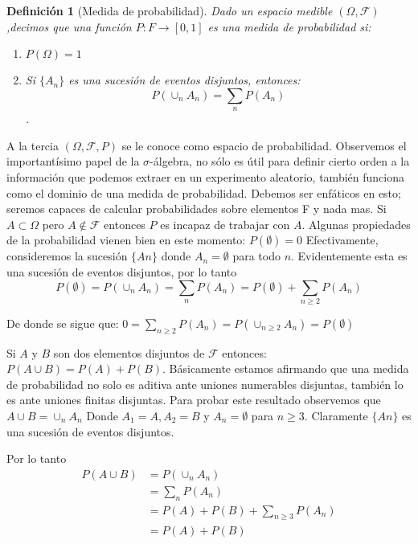 \documentclass[14pt]{extreport}
\newtheorem{definition}{Definición}[chapter]
\begin{document}
\begin{definition}[Medida de probabilidad]
Dado un espacio medible $(\Omega, \mathcal{F})$,decimos que una función $P : F \rightarrow [0,1]$ es una medida de probabilidad si:

\begin{enumerate}
    \item $P(\Omega) = 1$
    \item Si $\{A_n \}$ es una sucesión de eventos disjuntos, entonces:
    $$P\left(\cup_n A_n \right) = \sum_n P(A_n)$$.
\end{enumerate}
\end{definition}

A la tercia $(\Omega, \mathcal{F}, P)$ se le conoce como espacio de probabilidad. Observemos el importantísimo papel de la $\sigma$-álgebra, no sólo es útil para definir cierto orden a la información que podemos extraer en un experimento aleatorio, también funciona como el dominio de una medida de probabilidad. Debemos ser enfáticos en esto; seremos capaces de calcular probabilidades sobre elementos F y nada mas. Si $A \subset \Omega$ pero $A \notin \mathcal{F}$ entonces $P$ es incapaz de trabajar con $A$. Algunas propiedades de la probabilidad vienen bien en este momento: $P(\emptyset) = 0$ Efectivamente, consideremos la sucesión $\{An \}$ donde $A_n = \emptyset$ para todo $n$. Evidentemente esta es una sucesión de eventos disjuntos, por lo tanto 
$$
P(\emptyset) = P\left(\cup_n A_n\right) = \sum_n P(A_n ) = P(\emptyset) + \sum_{n\geq2} P(A_n )
$$

De donde se sigue que: $0 = \sum_{n\geq 2} P(A_n) = P\left(\cup_{n\geq 2} A_n\right) = P(\emptyset)$

Si $A$ y $B$ son dos elementos disjuntos de $\mathcal{F}$ entonces: $P\left(A \cup B\right) = P(A) + P(B)$. Básicamente estamos afirmando que una medida de probabilidad no solo es aditiva ante uniones numerables disjuntas, también lo es ante uniones finitas disjuntas. Para probar este resultado observemos que $A \cup B = \cup_n A_n$ Donde $A_1 = A, A_2 = B$ y $A_n = \emptyset$ para $n \geq 3$. Claramente $\{An \}$ es una sucesión de eventos disjuntos. 

Por lo tanto 
\begin{equation*}
\begin{split}
    P(A \cup B) & = P\left(\cup_n A_n \right)\\ 
                & = \sum_n P(A_n) \\
                & = P(A) + P(B) + \sum_{n\geq 3} P(A_n) \\
                & = P(A) + P(B)
\end{split}    
\end{equation*}
\end{document}

